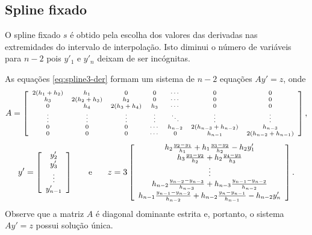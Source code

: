 \subsection{Spline fixado}

O spline fixado $s$ é obtido pela escolha dos valores das derivadas nas extremidades do intervalo de interpolação. Isto diminui o número de variáveis para $n-2$ pois $y'_1$ e $y'_n$ deixam de ser incógnitas.

As equações \eqref{eq:spline3-der} formam um sistema de $n-2$ equações $Ay' = z$, onde
\begin{equation}
	\begin{scriptsize}
		A=\left[\begin{array}{ccccccc}
			2(h_1+h_2)&h_1&0&0 &\cdots&0&0\\
			h_3&2(h_2+h_3)&h_2&0&\cdots&0&0\\
			0&h_4&2(h_3+h_4)&h_3&\cdots&0&0\\
			\vdots&\vdots&\vdots&\vdots&\ddots&\vdots&\vdots\\
			0&0&0&\cdots&h_{n-2} & 2(h_{n-3}+h_{n-2})&h_{n-3}\\
			0&0&0&\cdots &0&h_{n-1}&2(h_{n-2}+h_{n-1})
		\end{array}\right],
	\end{scriptsize}
\end{equation}
\begin{equation}
	\begin{small}
		y'= \left[\begin{array}{c}
			y'_2\\
			y'_3\\
			\vdots\\
			y'_{n-1}
		\end{array}\right]\qquad \text{e}\qquad
		z = 3\left[\begin{array}{c}
			h_2\frac{y_2-y_1}{h_1}+h_1\frac{y_3-y_2}{h_2}-h_2y'_1\\
			h_3\frac{y_3-y_2}{h_2}+h_2\frac{y_4-y_3}{h_3}\\
			\vdots\\
			h_{n-2}\frac{y_{n-2}-y_{n-3}}{h_{n-3}}+h_{n-3}\frac{y_{n-1}-y_{n-2}}{h_{n-2}}\\
			h_{n-1}\frac{y_{n-1}-y_{n-2}}{h_{n-2}}+h_{n-2}\frac{y_n-y_{n-1}}{h_{n-1}}-h_{n-2}y'_n
		\end{array}\right].
	\end{small}
\end{equation}
Observe que a matriz $A$ é diagonal dominante estrita e, portanto, o sistema $Ay' = z$ possui solução única.

